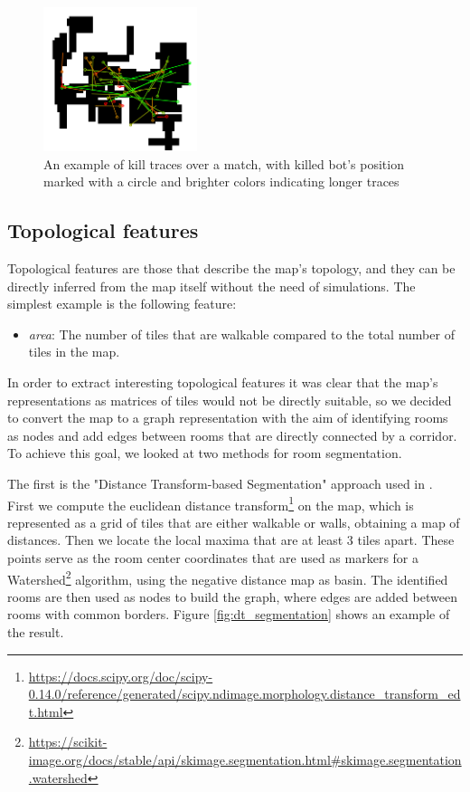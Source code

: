 \documentclass{Configuration_Files/PoliMi3i_thesis}
\begin{document}
\begin{figure}[H]
\label{fig:kill_traces_example}
    \centering
    \includegraphics[width=0.4\textwidth]{images/Traces_Example.png}
    \caption[Kill traces example]{An example of kill traces over a match, with killed bot's position marked with a circle and brighter colors indicating longer traces}
\end{figure}

\subsection{Topological features}
\label{subsec:topological_features}
Topological features are those that describe the map's topology, and they can be directly inferred from the map itself without the need of simulations. The simplest example is the following feature: 

\begin{itemize}
    \item \textit{area}: The number of tiles that are walkable compared to the total number of tiles in the map.
\end{itemize}

In order to extract interesting topological features it was clear that the map's representations as matrices of tiles would not be directly suitable, so we decided to convert the map to a graph representation with the aim of identifying rooms as nodes and add edges between rooms that are directly connected by a corridor. To achieve this goal, we looked at two methods for room segmentation. 

The first is the "Distance Transform-based Segmentation" approach used in \citep{bormann_room_2016}. First we compute the euclidean distance transform\footnote{\raggedright\url{https://docs.scipy.org/doc/scipy-0.14.0/reference/generated/scipy.ndimage.morphology.distance_transform_edt.html}} on the map, which is represented as a grid of tiles that are either walkable or walls, obtaining a map of distances. Then we locate the local maxima that are at least 3 tiles apart. These points serve as the room center coordinates that are used as markers for a Watershed\footnote{\raggedright\url{https://scikit-image.org/docs/stable/api/skimage.segmentation.html\#skimage.segmentation.watershed}} algorithm, using the negative distance map as basin. The identified rooms are then used as nodes to build the graph, where edges are added between rooms with common borders. Figure \ref{fig:dt_segmentation} shows an example of the result.
\end{document}
